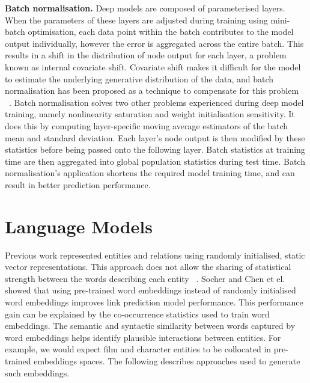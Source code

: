 \noindent \textbf{Batch normalisation.} Deep models are composed of parameterised layers. When the parameters of these layers are adjusted during training using mini-batch optimisation, each data point within the batch contributes to the model output individually, however the error is aggregated across the entire batch. This results in a shift in the distribution of node output for each layer, a problem known as internal covariate shift. Covariate shift makes it difficult for the model to estimate the underlying generative distribution of the data, and batch normalisation has been proposed as a technique to compensate for this problem \unskip ~\citep{ioffe2015batch}. \newline
Batch normalisation solves two other problems experienced during deep model training, namely nonlinearity saturation and weight initialisation sensitivity. It does this by computing layer-specific moving average estimators of the batch mean and standard deviation. Each layer's node output is then modified by these statistics before being passed onto the following layer. Batch statistics at training time are then aggregated into global population statistics during test time. Batch normalisation's application shortens the required model training time, and can result in better prediction performance. 



\section{Language Models}

\noindent Previous work represented entities and relations using randomly initialised, static vector representations. This approach does not allow the sharing of statistical strength between the words describing each entity \unskip~\citep{socher2013reasoning}. Socher and Chen et el. showed that using pre-trained word embeddings instead of randomly initialised word embeddings improves link prediction model performance. This performance gain can be explained by the co-occurrence statistics used to train word embeddings. The semantic and syntactic similarity between words captured by word embeddings helps identify plausible interactions between entities. For example, we would expect film and character entities to be collocated in pre-trained embeddings spaces. The following describes approaches used to generate such embeddings. \par

